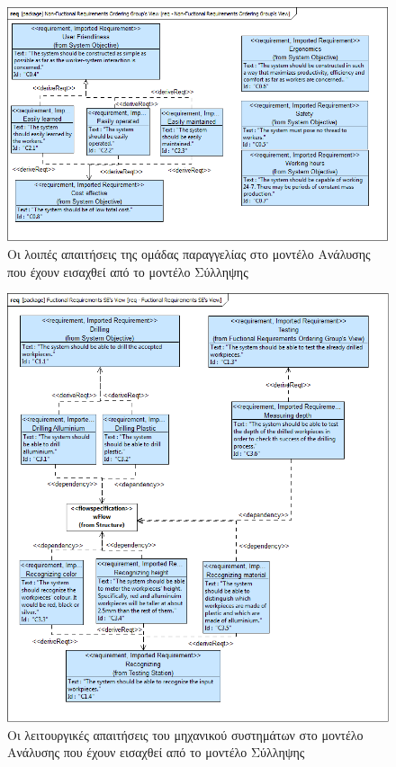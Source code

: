 \documentclass[a4paper,12pt,twoside]{report}
\begin{document}
\begin{appendices}
			\begin{figure}[hp]
					\centering
					\includegraphics[scale=0.45]{AnalysisModel_req-Non-FuctionalRequirementsOrderingGroupsView.png}
					\caption{Οι λοιπές απαιτήσεις της ομάδας παραγγελίας στο μοντέλο Ανάλυσης που έχουν εισαχθεί από το μοντέλο Σύλληψης}
				\label{φωτ:Οι λοιπές απαιτήσεις της ομάδας παραγγελίας στο μοντέλο Ανάλυσης που έχουν εισαχθεί από το μοντέλο Σύλληψης}
			\end{figure}
				
			\begin{figure}[hp]
					\centering
					\includegraphics[scale=0.45]{AnalysisModel_req-FuctionalRequirementsSEsView.png}
					\caption{Οι λειτουργικές απαιτήσεις του μηχανικού συστημάτων στο μοντέλο Ανάλυσης που έχουν εισαχθεί από το μοντέλο Σύλληψης}
					\label{φωτ:Οι λειτουργικές απαιτήσεις του μηχανικού συστημάτων στο μοντέλο Ανάλυσης που έχουν εισαχθεί από το μοντέλο Σύλληψης}
			\end{figure}
				

\end{appendices}
\end{document}
